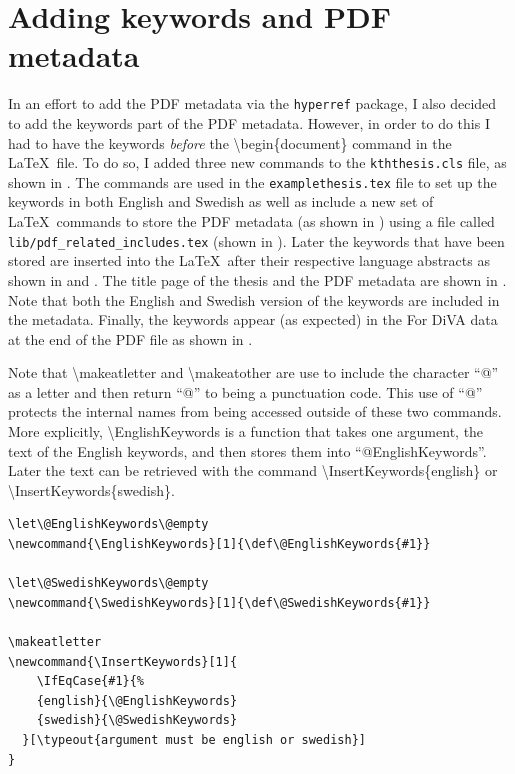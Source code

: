 \section{Adding keywords and PDF metadata}
\label{sec:addingKeywordsAndMetaDataToPDF}
In an effort to add the PDF metadata via the \texttt{hyperref} package, I also decided to add the keywords part of the PDF metadata. However, in order to do this I had to have the keywords \textit{before} the \textbackslash begin\{document\} command in the \LaTeX~file. To do so, I added three new commands to the \texttt{kththesis.cls} file, as shown in . The commands are used in the \texttt{examplethesis.tex} file to set up the keywords in both English and Swedish as well as include a new set of \LaTeX~commands to store the PDF metadata (as shown in ) using a file called \texttt{lib/pdf\_related\_includes.tex} (shown in ). Later the keywords that have been stored are inserted into the \LaTeX~after their respective language abstracts as shown in  and . The title page of the thesis and the PDF metadata are shown in . Note that both the English and Swedish version of the keywords are included in the metadata. Finally, the keywords appear (as expected) in the For DiVA data at the end of the PDF file as shown in .

Note that \textbackslash makeatletter and \textbackslash makeatother are use to include the character “@” as a letter and then return “@” to being a punctuation code. This use of “@” protects the internal names from being accessed outside of these two commands. More explicitly, \textbackslash EnglishKeywords is a function that takes one argument, the text of the English keywords, and then stores them into “@EnglishKeywords”. Later the text can be retrieved with the command \textbackslash InsertKeywords\{english\} or \textbackslash InsertKeywords\{swedish\}.
\begin{lstlisting}[language={[LaTeX]TeX}, caption={New commands in kththesis.cls}, label=lst:keywords]
% Keywords
\let\@EnglishKeywords\@empty
\newcommand{\EnglishKeywords}[1]{\def\@EnglishKeywords{#1}}

\let\@SwedishKeywords\@empty
\newcommand{\SwedishKeywords}[1]{\def\@SwedishKeywords{#1}}

\makeatletter
\newcommand{\InsertKeywords}[1]{
    \IfEqCase{#1}{%
    {english}{\@EnglishKeywords}
    {swedish}{\@SwedishKeywords}
  }[\typeout{argument must be english or swedish}]
}
\end{lstlisting}

